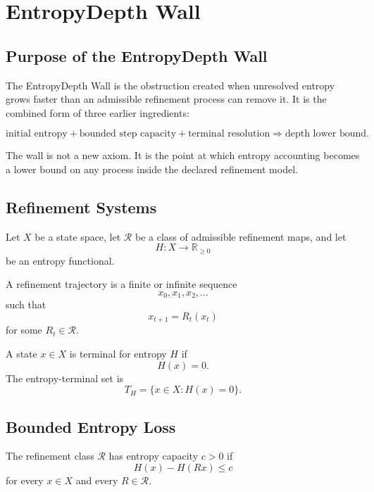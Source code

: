 \chapter{EntropyDepth Wall}

\section{Purpose of the EntropyDepth Wall}

The EntropyDepth Wall is the obstruction created when unresolved entropy grows
faster than an admissible refinement process can remove it. It is the combined
form of three earlier ingredients:

\[
\text{initial entropy}
+
\text{bounded step capacity}
+
\text{terminal resolution}
\Longrightarrow
\text{depth lower bound}.
\]

The wall is not a new axiom. It is the point at which entropy accounting
becomes a lower bound on any process inside the declared refinement model.

\section{Refinement Systems}

Let \(X\) be a state space, let \(\mathcal R\) be a class of admissible
refinement maps, and let
\[
H:X\to\mathbb R_{\ge 0}
\]
be an entropy functional.

\begin{definition}
A refinement trajectory is a finite or infinite sequence
\[
x_0,x_1,x_2,\ldots
\]
such that
\[
x_{t+1}=R_t(x_t)
\]
for some \(R_t\in\mathcal R\).
\end{definition}

\begin{definition}
A state \(x\in X\) is terminal for entropy \(H\) if
\[
H(x)=0.
\]
The entropy-terminal set is
\[
T_H=\{x\in X:H(x)=0\}.
\]
\end{definition}

\section{Bounded Entropy Loss}

\begin{definition}
The refinement class \(\mathcal R\) has entropy capacity \(c>0\) if
\[
H(x)-H(Rx)\le c
\]
for every \(x\in X\) and every \(R\in\mathcal R\).
\end{definition}

